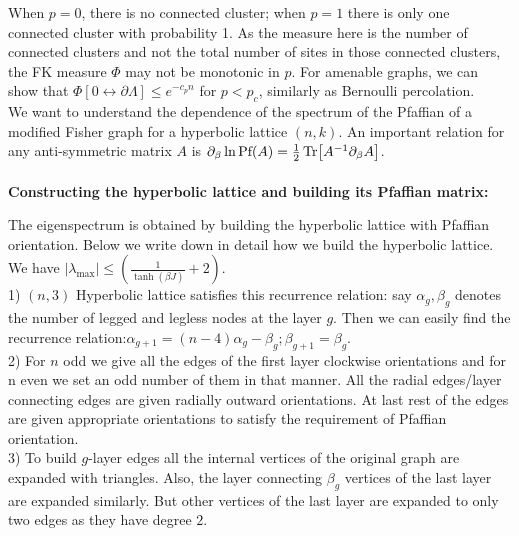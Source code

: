 \documentclass{article}
\begin{document}
	When $p=0$, there is no connected cluster; when $p=1$ there is only one connected cluster with probability 1. As the measure here is the number of connected clusters and not the total number of sites in those connected clusters, the FK measure $\Phi$ may not be monotonic in $p$. For amenable graphs, we can show that $\Phi[0 \leftrightarrow \partial \Lambda ] \leq e^{-c_pn}$ for $p<p_c$, similarly as Bernoulli percolation.  \\
	
	We want to understand the dependence of the spectrum of the Pfaffian of a modified Fisher graph for a hyperbolic lattice $(n,k)$. An important relation for any anti-symmetric matrix $A$ is $\partial_{\beta} \ln \text{Pf}(A)= \frac{1}{2}\Tr[A^{-1}\partial_{\beta}A]$. \\  
	
	\\	\vspace{0.2 cm}
	\textbf{Constructing the hyperbolic lattice and building its Pfaffian matrix:}\\
	\vspace{0.1 cm}
	
	The eigenspectrum is obtained by building the hyperbolic lattice with Pfaffian orientation. Below we write down in detail how we build the hyperbolic lattice. We have $|\lambda_{\text{max}}| \leq (\frac{1}{\tanh(\beta J)}+2)$.\\
	
	1) $(n,3)$ Hyperbolic lattice satisfies this recurrence relation: say $\alpha_g, \beta_g$ denotes the number of legged and legless nodes at the layer $g$. Then we can easily find the recurrence relation:$\alpha_{g+1}=(n-4)\alpha_g-\beta_{g} ; \beta_{g+1}=\beta_g$.\\
	
	2) For $n$ odd we give all the edges of the first layer clockwise orientations and for n even we set an odd number of them in that manner. All the radial edges/layer connecting edges are given radially outward orientations. At last rest of the edges are given appropriate orientations to satisfy the requirement of Pfaffian orientation. \\
	
	3) To build $g$-layer edges all the internal vertices of the original graph are expanded with triangles. Also, the layer connecting $\beta_{g}$ vertices of the last layer are expanded similarly. But other vertices of the last layer are expanded to only two edges as they have degree $2$. \\
	
\end{document}
